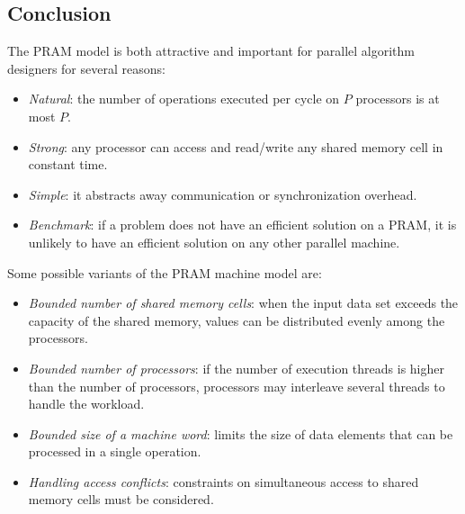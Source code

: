 \subsection{Conclusion}
The PRAM model is both attractive and important for parallel algorithm designers for several reasons:
\begin{itemize}
    \item \textit{Natural}: the number of operations executed per cycle on $P$ processors is at most $P$.
    \item \textit{Strong}: any processor can access and read/write any shared memory cell in constant time.
    \item \textit{Simple}: it abstracts away communication or synchronization overhead.
    \item \textit{Benchmark}: if a problem does not have an efficient solution on a PRAM, it is unlikely to have an efficient solution on any other parallel machine.
\end{itemize}
Some possible variants of the PRAM machine model are: 
\begin{itemize}
    \item \textit{Bounded number of shared memory cells}: when the input data set exceeds the capacity of the shared memory, values can be distributed evenly among the processors.
    \item \textit{Bounded number of processors}: if the number of execution threads is higher than the number of processors, processors may interleave several threads to handle the workload.
    \item \textit{Bounded size of a machine word}: limits the size of data elements that can be processed in a single operation.
    \item \textit{Handling access conflicts}: constraints on simultaneous access to shared memory cells must be considered.
\end{itemize}